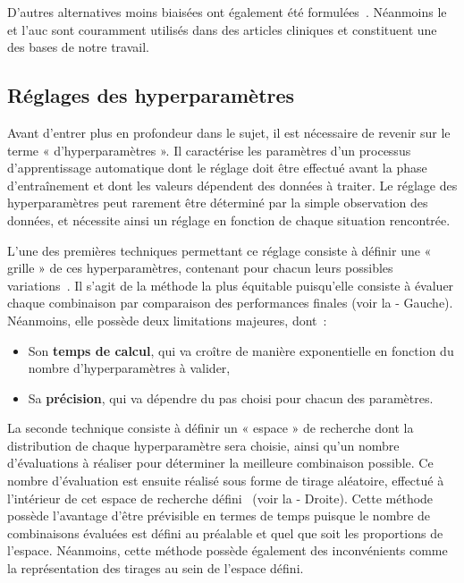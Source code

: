 D'autres alternatives moins biaisées ont également été formulées~\cite{Sokolova2006}. Néanmoins le \fscore{} et l'\gls{auc} sont couramment utilisés dans des articles cliniques et constituent une des bases de notre travail.\par

\subsection{Réglages des hyperparamètres}
\label{subsec:hyperparameter}
Avant d’entrer plus en profondeur dans le sujet, il est nécessaire de revenir sur le terme « d’hyperparamètres ». Il caractérise les paramètres d'un processus d'apprentissage automatique dont le réglage doit être effectué avant la phase d'entraînement et dont les valeurs dépendent des données à traiter. Le réglage des hyperparamètres peut rarement être déterminé par la simple observation des données, et nécessite ainsi un réglage en fonction de chaque situation rencontrée.\par

L’une des premières techniques permettant ce réglage consiste à définir une « grille » de ces hyperparamètres, contenant pour chacun leurs possibles variations~\cite{Liu2006}. Il s'agit de la méthode la plus équitable puisqu'elle consiste à évaluer chaque combinaison par comparaison des performances finales (voir la  - Gauche). Néanmoins, elle possède deux limitations majeures, dont~:
\begin{itemize}
    \item Son \textbf{temps de calcul}, qui va croître de manière exponentielle en fonction du nombre d'hyperparamètres à valider,
    \item Sa \textbf{précision}, qui va dépendre du pas choisi pour chacun des paramètres.
\end{itemize}\par

La seconde technique consiste à définir un « espace » de recherche dont la distribution de chaque hyperparamètre sera choisie, ainsi qu'un nombre d'évaluations à réaliser pour déterminer la meilleure combinaison possible. Ce nombre d'évaluation est ensuite réalisé sous forme de tirage aléatoire, effectué à l'intérieur de cet espace de recherche défini~\cite{bergstra2012} (voir la  - Droite). Cette méthode possède l'avantage d'être prévisible en termes de temps puisque le nombre de combinaisons évaluées est défini au préalable et quel que soit les proportions de l'espace. Néanmoins, cette méthode possède également des inconvénients comme la représentation des tirages au sein de l'espace défini.

